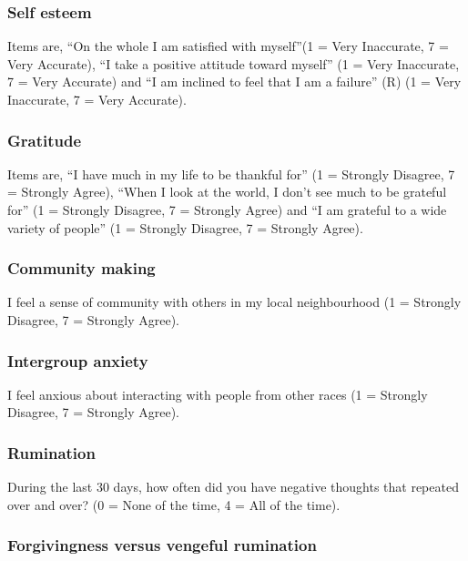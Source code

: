 \documentclass[
]{interact}
\begin{document}
\subsubsection{Self esteem}\label{self-esteem}

Items are, ``On the whole I am satisfied with myself''(1 = Very
Inaccurate, 7 = Very Accurate), ``I take a positive attitude toward
myself'' (1 = Very Inaccurate, 7 = Very Accurate) and ``I am inclined to
feel that I am a failure'' (R) (1 = Very Inaccurate, 7 = Very Accurate).

\subsubsection{Gratitude}\label{gratitude}

Items are, ``I have much in my life to be thankful for'' (1 = Strongly
Disagree, 7 = Strongly Agree), ``When I look at the world, I don't see
much to be grateful for'' (1 = Strongly Disagree, 7 = Strongly Agree)
and ``I am grateful to a wide variety of people'' (1 = Strongly
Disagree, 7 = Strongly Agree).

\subsubsection{Community making}\label{community-making}

I feel a sense of community with others in my local neighbourhood (1 =
Strongly Disagree, 7 = Strongly Agree).

\subsubsection{Intergroup anxiety}\label{intergroup-anxiety}

I feel anxious about interacting with people from other races (1 =
Strongly Disagree, 7 = Strongly Agree).

\subsubsection{Rumination}\label{rumination}

During the last 30 days, how often did you have negative thoughts that
repeated over and over? (0 = None of the time, 4 = All of the time).

\subsubsection{Forgivingness versus vengeful
rumination}\label{forgivingness-versus-vengeful-rumination}
\end{document}
